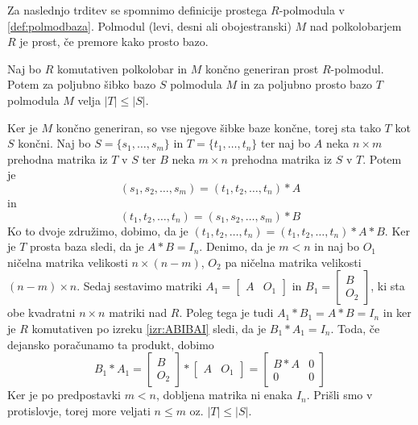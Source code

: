\documentclass[mat1]{fmfdelo}
\newcommand{\abs}[1]{\ensuremath{\lvert #1 \rvert}}
\begin{document}
Za naslednjo trditev se spomnimo definicije prostega $R$-polmodula v \ref{def:polmodbaza}. Polmodul (levi, desni ali obojestranski) $M$ nad polkolobarjem $R$ je prost, če premore kako prosto bazo.

\begin{trditev}\label{trd:kardprostvsneprostbaz}
	Naj bo $R$ komutativen polkolobar in $M$ končno generiran prost $R$-polmodul. Potem za poljubno šibko bazo $S$ polmodula $M$ in za poljubno prosto bazo $T$ polmodula $M$ velja $\abs{T}\leq\abs{S}$.
\end{trditev}

\begin{dokaz}
	Ker je $M$ končno generiran, so vse njegove šibke baze končne, torej sta tako $T$ kot $S$ končni. Naj bo $S = \{s_1,\ldots, s_m\}$ in $T =\{t_1, \ldots, t_n\}$ ter naj bo $A$ neka $n\times m$ prehodna matrika iz $T$ v $S$ ter $B$ neka $m\times n$ prehodna matrika iz $S$ v $T$. Potem je $$(s_1, s_2, \ldots, s_m) = (t_1, t_2, \ldots, t_n)*A$$ in $$(t_1, t_2, \ldots, t_n) = (s_1, s_2, \ldots, s_m)*B$$ Ko to dvoje združimo, dobimo, da je $(t_1, t_2, \ldots, t_n) = (t_1, t_2, \ldots, t_n)*A*B$. Ker je $T$ prosta baza sledi, da je $A*B = I_n$. Denimo, da je $m < n$ in naj bo $O_1$ ničelna matrika velikosti $n\times (n-m)$, $O_2$ pa ničelna matrika velikosti $(n-m)\times n$. Sedaj sestavimo matriki $A_1 = \begin{bmatrix}
A & O_1
\end{bmatrix}$ in $B_1 = \begin{bmatrix}
B \\
 O_2
\end{bmatrix}$, ki sta obe kvadratni $n\times n$ matriki nad $R$. Poleg tega je tudi $A_1*B_1 = A*B = I_n$ in ker je $R$ komutativen po izreku \ref{izr:ABIBAI} sledi, da je $B_1*A_1 = I_n$. Toda, če dejansko poračunamo ta produkt, dobimo $$B_1*A_1 = \begin{bmatrix}
B \\
O_2
\end{bmatrix} * \begin{bmatrix}
A & O_1
\end{bmatrix} = \begin{bmatrix}
B*A & 0 \\
0 & 0
\end{bmatrix}$$ Ker je po predpostavki $m < n$, dobljena matrika ni enaka $I_n$. Prišli smo v protislovje, torej more veljati $n \leq m$ oz. $\abs{T} \leq \abs{S}$.
\end{dokaz}
\end{document}
